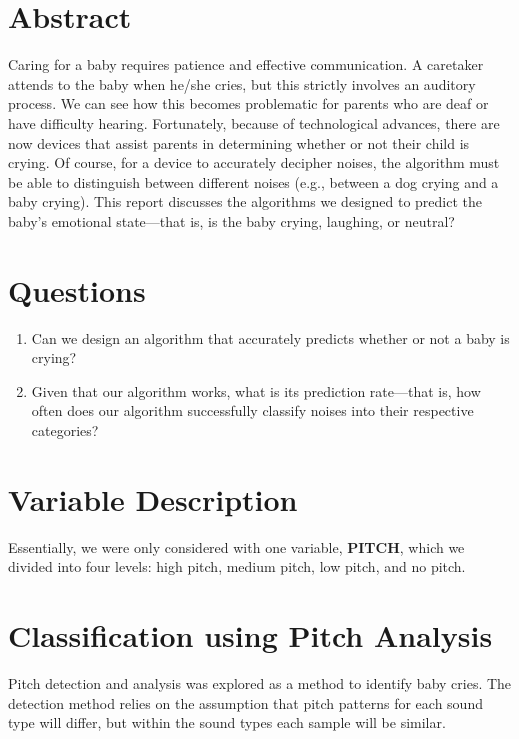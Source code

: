 \documentclass[paper=a4, fontsize=11pt]{scrartcl}
\numberwithin{equation}{section}
\numberwithin{figure}{section}
\numberwithin{table}{section}
\begin{document}
\section{Abstract}
%
% 
%
Caring for a baby requires patience and effective communication. A caretaker attends to the baby when he/she cries, but this strictly involves an auditory process. We can see how this becomes problematic for parents who are deaf or have difficulty hearing. Fortunately, because of technological advances, there are now devices that assist parents in determining whether or not their child is crying. Of course, for a device to accurately decipher noises, the algorithm must be able to distinguish between different noises (e.g., between a dog crying and a baby crying). This report discusses the algorithms we designed to predict the baby's emotional state---that is, is the baby crying, laughing, or neutral? 


\section{Questions}
\begin{enumerate}
	\item Can we design an algorithm that accurately predicts whether or not a baby is crying?
	\item Given that our algorithm works, what is its prediction rate---that is, how often does our algorithm successfully classify noises into their respective categories?
\end{enumerate}

\section{Variable Description}

Essentially, we were only considered with one variable, \textbf{PITCH}, which we divided into four levels: high pitch, medium pitch, low pitch, and no pitch.

\section{Classification using Pitch Analysis}
Pitch detection and analysis was explored as a method to identify baby cries. The detection method relies on the assumption that pitch patterns for each sound type will differ, but within the sound types each sample will be similar.
\end{document}

